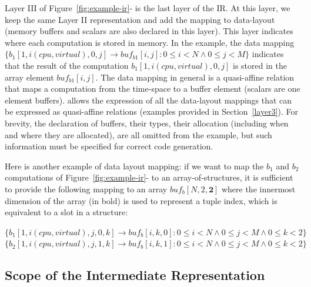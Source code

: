 
Layer III of Figure~\ref{fig:example-ir}-\codeone{} is the last layer of the \framework IR.  At this layer, we keep the same Layer II representation and add the mapping to data-layout (memory buffers and scalars are also declared in this layer).
This layer indicates where each computation is stored in memory.  In the example, the data mapping $\{b_1[1, i (cpu, virtual), 0, j] \rightarrow {buf}_{b1}[i,j]:  0\leq i < N \wedge 0\leq j < M\}$ indicates that the result of the computation $b_1[1, i (cpu, virtual), 0, j]$ is stored in the array element ${buf}_{b1}[i,j]$.
The data mapping in general is a quasi-affine relation that maps a computation from the time-\processor space to a buffer element (scalars are one element buffers).  \framework allows the expression of all the data-layout mappings that can be expressed as quasi-affine relations (examples provided in Section~\ref{layer3}).
For brevity, the declaration of buffers, their types, their allocation (including when and where they are allocated), are all omitted from the example, but such information must be specified for correct code generation.

Here is another example of data layout mapping: if we want to map the $b_1$ and $b_2$ computations of Figure~\ref{fig:example-ir}-\codefour{} to an array-of-structures, it is sufficient to provide the following mapping to an array $buf_b[N, 2, \boldsymbol{2}]$ where the innermost dimension of the array (in bold) is used to represent a tuple index, which is equivalent to a slot in a structure:

\noindent $\{b_1[1, i (cpu, virtual), j, 0, k] \rightarrow buf_b[i, k, 0]:  0\leq i < N \wedge 0\leq j < M \wedge 0\leq k < 2\}$ \\
$\{b_2[1, i (cpu, virtual), j, 1, k] \rightarrow buf_b[i, k, 1]:  0\leq i < N \wedge 0\leq j < M \wedge 0\leq k< 2\}$ \\

\subsection{Scope of the Intermediate Representation}


